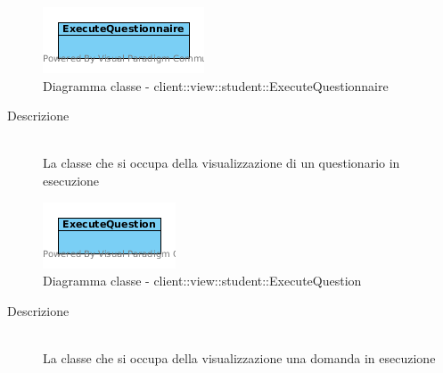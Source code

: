 \vspace{0.5cm}
\hypertarget{client::view::student::ExecuteQuestionnaire}{}
\begin{center}
			\begin{figure}[H]
				\centering \includegraphics[scale=4, max width=\textwidth, max height=\myheight]{../img/diagrammiClassi/client/view/student/ExecuteQuestionnaire.png}
				\caption{Diagramma classe - client::view::student::ExecuteQuestionnaire}
			\end{figure}
		\end{center}\begin{description}
\item[Descrizione] \hfill \\
 La classe che si occupa della visualizzazione di un questionario in esecuzione
\end{description}

\vspace{0.5cm}
\hypertarget{client::view::student::ExecuteQuestion}{}
\begin{center}
			\begin{figure}[H]
				\centering \includegraphics[scale=4, max width=\textwidth, max height=\myheight]{../img/diagrammiClassi/client/view/student/ExecuteQuestion.png}
				\caption{Diagramma classe - client::view::student::ExecuteQuestion}
			\end{figure}
		\end{center}\begin{description}
\item[Descrizione] \hfill \\
 La classe che si occupa della visualizzazione una domanda in esecuzione
\end{description}

